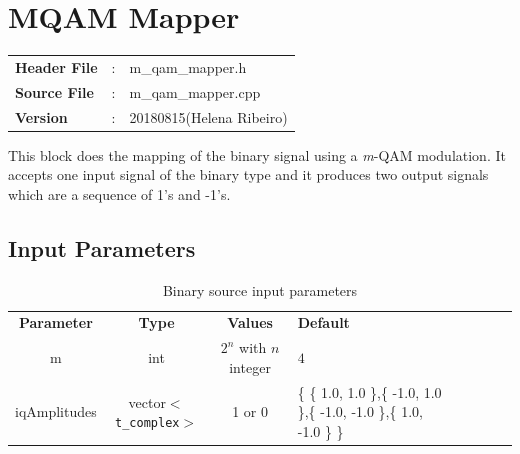 \clearpage

\section{MQAM Mapper}

\begin{tcolorbox}	
	\begin{tabular}{p{2.75cm} p{0.2cm} p{10.5cm}} 	
		\textbf{Header File}   &:& m\_qam\_mapper.h \\
		\textbf{Source File}   &:& m\_qam\_mapper.cpp \\
		\textbf{Version}	&:& 20180815(Helena Ribeiro)\\
	\end{tabular}
\end{tcolorbox}

This block does the mapping of the binary signal using a \textit{m}-QAM modulation. It accepts one input signal of the binary type and it produces two output signals which are a sequence of 1's and -1's.

\subsection*{Input Parameters}

\begin{table}[h]
	\centering
	\begin{tabular}{|c|c|c|p{50mm}|cccp{50mm}}
		\cline{1-4}
		\textbf{Parameter} & \textbf{Type} & \textbf{Values} &   \textbf{Default}& \\ \cline{1-4}
		m & int & $2^n$ with $n$ integer & $4$ \\ \cline{1-4}
		iqAmplitudes & vector$<$\texttt{t\_complex}$>$ & 1 or 0 & \{ \{ 1.0, 1.0 \},\{ -1.0, 1.0 \},\{ -1.0, -1.0 \},\{ 1.0, -1.0 \} \} \\ \cline{1-4}
	\end{tabular}
	\caption{Binary source input parameters}
	\label{table:mapper_in_par}
\end{table}

%	

